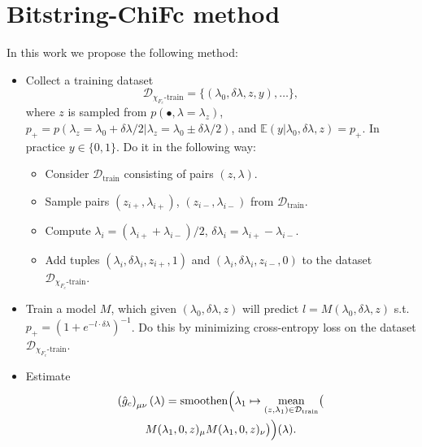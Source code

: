 \documentclass[
  american,aps,pra,reprint,floatfix,nofootinbib,superscriptaddress
]{revtex4-2}
\DeclareMathOperator{\smoothen}{smoothen}
\DeclareMathOperator{\mean}{mean}
\begin{document}
\section{Bitstring-ChiFc method}
In this work we propose the following method:
\begin{itemize}
  \item Collect a training dataset
  \begin{equation}
    \mathcal{D}_{\chi_{F_c}\textrm{-train}} = \{(\lambda_0, \delta \lambda, z, y),\dots\},
  \end{equation}
  where $z$ is sampled from
  $p(\bullet, \lambda=\lambda_{z})$,
  $p_{+} = p(\lambda_{z} = \lambda_0 + \delta \lambda / 2| \lambda_{z} = \lambda_0 \pm \delta \lambda / 2)$, and
    $\mathbb{E}(y|\lambda_0, \delta \lambda, z) = p_{+}$.
    In practice $y \in \{0, 1\}$.
    Do it in the following way:
    \begin{itemize}
      \item Consider $\mathcal{D}_{\textrm{train}}$ consisting of pairs
      $(z, \lambda)$.
      \item Sample pairs $(z_{i{+}}, \lambda_{i{+}})$,
      $(z_{i{-}}, \lambda_{i{-}})$ from $\mathcal{D}_{\textrm{train}}$.
      \item Compute $\lambda_i = (\lambda_{i{+}} + \lambda_{i{-}})/2$,
      $\delta \lambda_i = \lambda_{i{+}} - \lambda_{i{-}}$.
      \item Add tuples $(\lambda_i, \delta \lambda_i, z_{i{+}}, 1)$ and $(\lambda_i, \delta \lambda_i, z_{i{-}}, 0)$ to the dataset $\mathcal{D}_{\chi_{F_c}\textrm{-train}}$.
    \end{itemize}
  \item Train a model $M$, which given $(\lambda_0, \delta \lambda, z)$
  will predict $l = M(\lambda_0, \delta \lambda, z)$
  s.t. $p_{+} = (1+e^{-l \cdot \delta \lambda})^{-1}$.
  Do this by minimizing cross-entropy loss on the dataset
  $\mathcal{D}_{\chi_{F_c}\textrm{-train}}$.
  \item Estimate
  \begin{multline}
  \label{eq:chifc-from-M}
  \left(\hat g_{c}\right)_{\mu\nu}(\lambda) = \smoothen\Bigl(
  \lambda_1 \mapsto \mean_{(z, \lambda_1) \in \mathcal{D}_{\textrm{train}}}
  \bigl(\\
  M(\lambda_1, 0, z)_{\mu}M(\lambda_1, 0, z)_{\nu}\bigr)\Bigr)(\lambda).
  \end{multline}
\end{itemize}
\end{document}
